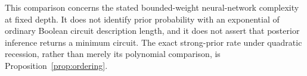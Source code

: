 This comparison concerns the stated bounded-weight neural-network
complexity at fixed depth. It does not identify prior probability with an
exponential of ordinary Boolean circuit description length, and it does
not assert that posterior inference returns a minimum circuit. The exact
strong-prior rate under quadratic recession, rather than merely its
polynomial comparison, is Proposition~\ref{prop:ordering}.
